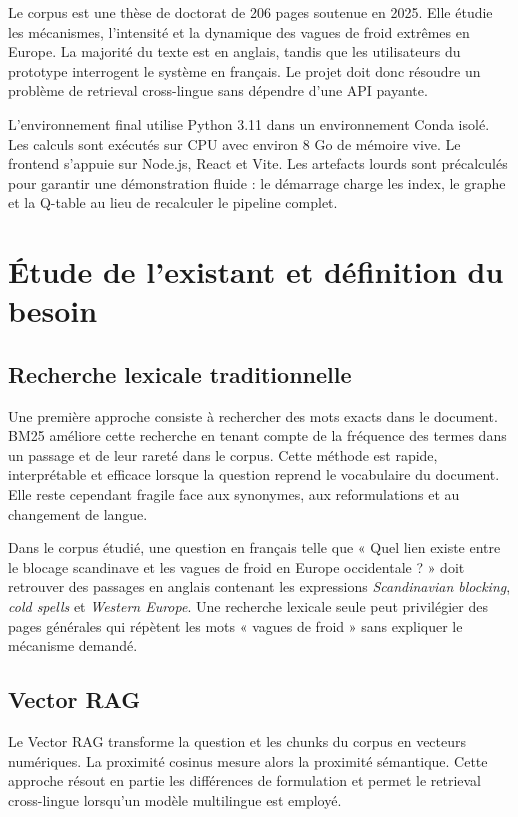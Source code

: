 \documentclass[12pt,a4paper,oneside]{report}
\begin{document}
Le corpus est une thèse de doctorat de 206 pages soutenue en 2025. Elle étudie les mécanismes, l'intensité et la dynamique des vagues de froid extrêmes en Europe. La majorité du texte est en anglais, tandis que les utilisateurs du prototype interrogent le système en français. Le projet doit donc résoudre un problème de retrieval cross-lingue sans dépendre d'une API payante.

L'environnement final utilise Python 3.11 dans un environnement Conda isolé. Les calculs sont exécutés sur CPU avec environ 8 Go de mémoire vive. Le frontend s'appuie sur Node.js, React et Vite. Les artefacts lourds sont précalculés pour garantir une démonstration fluide : le démarrage charge les index, le graphe et la Q-table au lieu de recalculer le pipeline complet.

\section{Étude de l'existant et définition du besoin}
\subsection{Recherche lexicale traditionnelle}
Une première approche consiste à rechercher des mots exacts dans le document. BM25 améliore cette recherche en tenant compte de la fréquence des termes dans un passage et de leur rareté dans le corpus. Cette méthode est rapide, interprétable et efficace lorsque la question reprend le vocabulaire du document. Elle reste cependant fragile face aux synonymes, aux reformulations et au changement de langue.

Dans le corpus étudié, une question en français telle que « Quel lien existe entre le blocage scandinave et les vagues de froid en Europe occidentale ? » doit retrouver des passages en anglais contenant les expressions \textit{Scandinavian blocking}, \textit{cold spells} et \textit{Western Europe}. Une recherche lexicale seule peut privilégier des pages générales qui répètent les mots « vagues de froid » sans expliquer le mécanisme demandé.

\subsection{Vector RAG}
Le Vector RAG transforme la question et les chunks du corpus en vecteurs numériques. La proximité cosinus mesure alors la proximité sémantique. Cette approche résout en partie les différences de formulation et permet le retrieval cross-lingue lorsqu'un modèle multilingue est employé.
\end{document}
